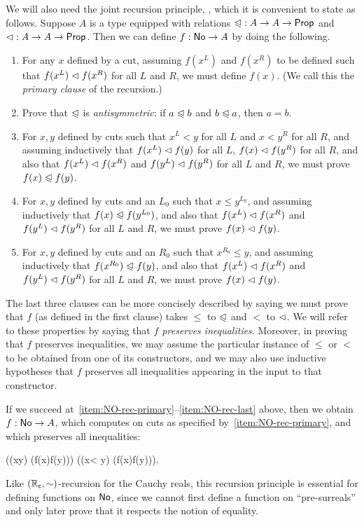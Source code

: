 We will also need the joint recursion principle, , which it is convenient to state as follows.
Suppose $A$ is a type equipped with relations $\mathord{\trianglelefteqslant}:A\to A\to\mathsf{Prop}$ and $\mathord{\vartriangleleft}:A\to A\to\mathsf{Prop}$.
Then we can define $f:\mathsf{No}\to A$ by doing the following.
\begin{enumerate}
\item For any $x$ defined by a cut, assuming $f(x^L)$ and $f(x^R)$ to be defined such that $f(x^L)\vartriangleleft f(x^R)$ for all $L$ and $R$, we must define $f(x)$.  (We call this the \emph{primary clause} of the recursion.)\label{item:NO-rec-primary}
\item Prove that $\trianglelefteqslant$ is \emph{antisymmetric}: if $a\trianglelefteqslant b$ and $b\trianglelefteqslant a$, then $a=b$.
\item For $x,y$ defined by cuts such that $x^L<y$ for all $L$ and $x<y^R$ for all $R$, and assuming inductively that $f(x^L)\vartriangleleft f(y)$ for all $L$, $f(x)\vartriangleleft f(y^R)$ for all $R$, and also that $f(x^L)\vartriangleleft f(x^R)$ and $f(y^L)\vartriangleleft f(y^R)$ for all $L$ and $R$, we must prove $f(x)\trianglelefteqslant f(y)$.
\item For $x,y$ defined by cuts and an $L_0$ such that $x\le y^{L_0}$, and assuming inductively that $f(x)\trianglelefteqslant f(y^{L_0})$, and also that $f(x^L)\vartriangleleft f(x^R)$ and $f(y^L)\vartriangleleft f(y^R)$ for all $L$ and $R$, we must prove $f(x)\vartriangleleft f(y)$.
\item For $x,y$ defined by cuts and an $R_0$ such that $x^{R_0}\le y$, and assuming inductively that $f(x^{R_0})\trianglelefteqslant f(y)$, and also that $f(x^L)\vartriangleleft f(x^R)$ and $f(y^L)\vartriangleleft f(y^R)$ for all $L$ and $R$, we must prove $f(x)\vartriangleleft f(y)$.\label{item:NO-rec-last}
\end{enumerate}
The last three clauses can be more concisely described by saying we must prove that $f$ (as defined in the first clause) takes $\le$ to $\trianglelefteqslant$ and $<$ to $\vartriangleleft$.
We will refer to these properties by saying that \emph{$f$ preserves inequalities}.
Moreover, in proving that $f$ preserves inequalities, we may assume the particular instance of $\le$ or $<$ to be obtained from one of its constructors, and we may also use inductive hypotheses that $f$ preserves all inequalities appearing in the input to that constructor.

If we succeed at~\ref{item:NO-rec-primary}--\ref{item:NO-rec-last} above, then we obtain $f:\mathsf{No}\to A$, which computes on cuts as specified by~\ref{item:NO-rec-primary}, and which preserves all inequalities:
%
\begin{narrowmultline*}
  \Big((x\le y) \to (f(x)\ble f(y))\Big) \land
  \narrowbreak
  \Big((x< y) \to (f(x)\blt f(y))\Big).  
\end{narrowmultline*}
%
Like $(\mathbb{R}_\mathsf{c},\mathord\sim)$-recursion for the Cauchy reals, this recursion principle is essential for defining functions on $\mathsf{No}$, since we cannot first define a function on ``pre-surreals'' and only later prove that it respects the notion of equality.

